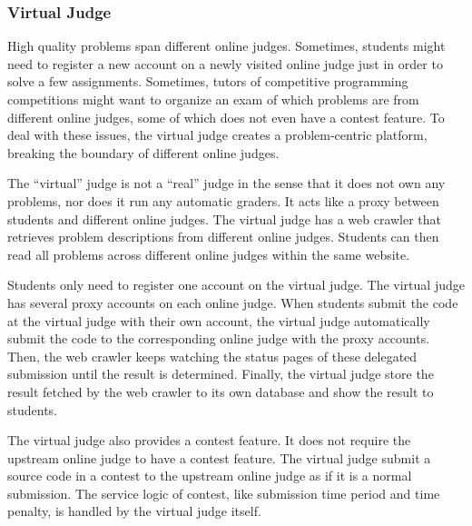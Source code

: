         \subsubsection{Virtual Judge}

            High quality problems span different online judges.
            Sometimes, students might need to register a new account on a newly visited online judge
            just in order to solve a few assignments.
            Sometimes, tutors of competitive programming competitions might want to organize an exam
            of which problems are from different online judges,
            some of which does not even have a contest feature.
            To deal with these issues, the virtual judge \cite{vjudge} creates a problem-centric platform,
            breaking the boundary of different online judges.

            The ``virtual'' judge is not a ``real'' judge in the sense that it does not own any problems,
            nor does it run any automatic graders.
            It acts like a proxy between students and different online judges.
            The virtual judge has a web crawler that retrieves problem descriptions from different online judges.
            Students can then read all problems across different online judges within the same website.

            Students only need to register one account on the virtual judge.
            The virtual judge has several proxy accounts on each online judge.
            When students submit the code at the virtual judge with their own account,
            the virtual judge automatically submit the code to the corresponding online judge
            with the proxy accounts.
            Then, the web crawler keeps watching the status pages of these delegated submission
            until the result is determined.
            Finally, the virtual judge store the result fetched by the web crawler to its own database
            and show the result to students.

            The virtual judge also provides a contest feature.
            It does not require the upstream online judge to have a contest feature.
            The virtual judge submit a source code in a contest to the upstream online judge
            as if it is a normal submission.
            The service logic of contest, like submission time period and time penalty, is handled
            by the virtual judge itself.

